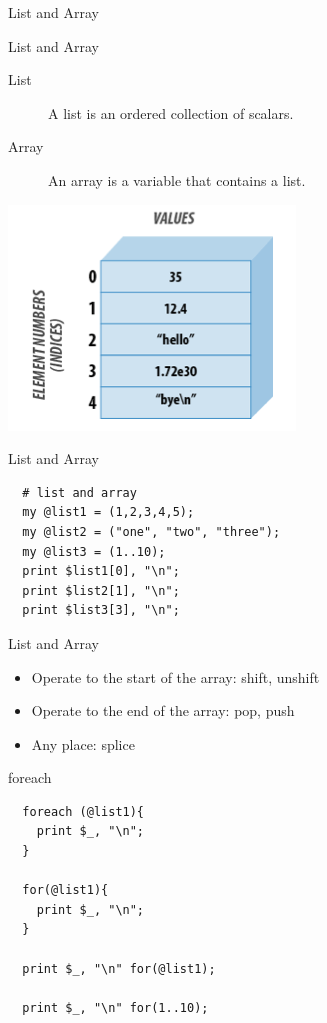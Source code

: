 \documentclass[UTF8]{beamer}
\begin{document}
\begin{frame}[t]{List and Array}
\begin{block}{List and Array}
  \begin{description}
    \item[List] A list is an ordered collection of scalars.
    \item[Array] An array is a variable that contains a list.
  \end{description}
\end{block}
\centerline{\includegraphics[height=.4\textheight]{list.png}}
\end{frame}

\begin{frame}[fragile]{List and Array}
\begin{verbatim}
  # list and array
  my @list1 = (1,2,3,4,5);
  my @list2 = ("one", "two", "three");
  my @list3 = (1..10);
  print $list1[0], "\n";
  print $list2[1], "\n";
  print $list3[3], "\n";
\end{verbatim}
\end{frame}

\begin{frame}[fragile]{List and Array}
\begin{itemize}
  \item Operate to the start of the array: shift, unshift
  \item Operate to the end of the array: pop, push
  \item Any place: splice
\end{itemize}
\end{frame}

\begin{frame}[fragile]{foreach}
\begin{verbatim}
  foreach (@list1){
    print $_, "\n";
  }

  for(@list1){
    print $_, "\n";
  }

  print $_, "\n" for(@list1);

  print $_, "\n" for(1..10);
\end{verbatim}
\end{frame}
\end{document}
